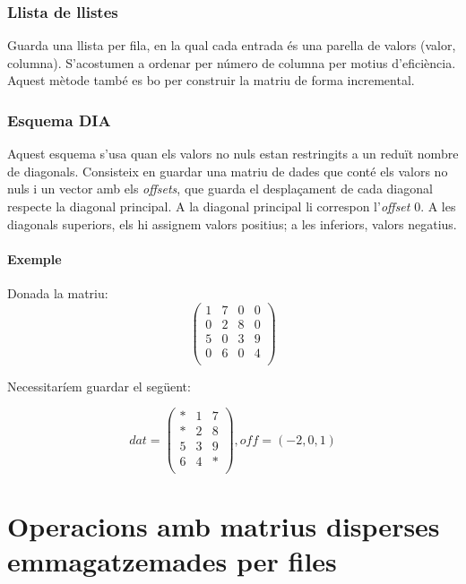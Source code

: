 \documentclass[11pt,a4paper,twoside]{report}
\begin{document}
 \subsection{Llista de llistes}

Guarda una llista per fila, en la qual cada entrada és una parella de valors (valor, columna). S'acostumen a ordenar per número de columna per motius d'eficiència. Aquest mètode també es bo per construir la matriu de forma incremental.

\subsection{Esquema DIA}

Aquest esquema s'usa quan els valors no nuls estan restringits a un reduït nombre de diagonals. Consisteix en guardar una matriu de dades que conté els valors no nuls i un vector amb els \textit{offsets}, que guarda el desplaçament de cada diagonal respecte la diagonal principal.\newline
A la diagonal principal li correspon l'\textit{offset} 0. A les diagonals superiors, els hi assignem valors positius; a les inferiors, valors negatius.

\subsubsection*{Exemple}

Donada la matriu:
 \[
 	\begin{pmatrix}
		  	1	&	7	& 0	&	0	\\
		  	0	&	2	&	8	&	0	\\
		 	5	&	0	&	3	&	9	\\
		0	&	6	&	0	&	4	\\
\end{pmatrix} \]

Necessitaríem guardar el següent:
 
  \[ dat = 
 	\begin{pmatrix}
		  	*	&	1	& 7	\\
		  	*	&	2	&	8	\\
		 	5	&	3	&	9	\\
		6	&	4	&	*	\\
\end{pmatrix} , off = (-2, 0, 1)    
 \] 

\chapter{Operacions amb matrius disperses emmagatzemades per files}
\end{document}
